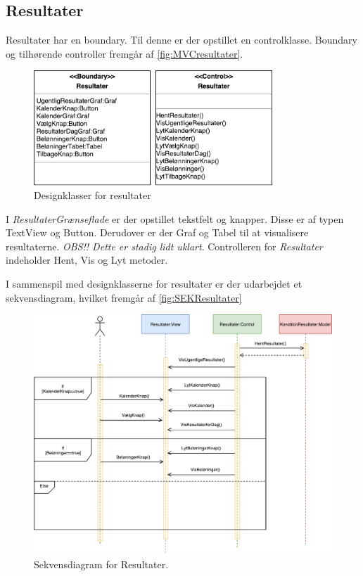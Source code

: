 \subsection*{Resultater}
Resultater har en boundary. Til denne er der opstillet en controlklasse. Boundary og tilhørende controller fremgår af \autoref{fig:MVCresultater}. 

\begin{figure} [H]
\centering
\includegraphics[width=0.8\textwidth]{figures/MVC/Resultater}
\caption{Designklasser for resultater}
\label{fig:MVCresultater}
\end{figure}

\noindent
I \textit{ResultaterGrænseflade} er der opstillet tekstfelt og knapper. Disse er af typen TextView og Button. Derudover er der Graf og Tabel til at visualisere resultaterne. \textit{OBS!! Dette er stadig lidt uklart}. 
Controlleren for \textit{Resultater} indeholder Hent, Vis og Lyt metoder. 

I sammenspil med designklasserne for resultater er der udarbejdet et sekvensdiagram, hvilket fremgår af \autoref{fig:SEKResultater}

\begin{figure} [H]
\centering
\includegraphics[width=1\textwidth]{figures/Sek/SEKResultater}
\caption{Sekvensdiagram for Resultater.}
\label{fig:SEKResultater}
\end{figure} 

